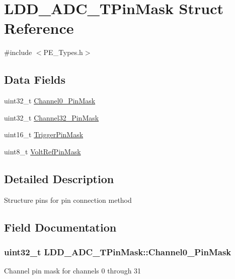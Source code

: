 \hypertarget{struct_l_d_d___a_d_c___t_pin_mask}{}\section{L\+D\+D\+\_\+\+A\+D\+C\+\_\+\+T\+Pin\+Mask Struct Reference}
\label{struct_l_d_d___a_d_c___t_pin_mask}


{\ttfamily \#include $<$P\+E\+\_\+\+Types.\+h$>$}

\subsection*{Data Fields}
\begin{DoxyCompactItemize}
\item 
uint32\+\_\+t \hyperlink{struct_l_d_d___a_d_c___t_pin_mask_a66d94f79f603c74c93540553a49bbf3f}{Channel0\+\_\+Pin\+Mask}
\item 
uint32\+\_\+t \hyperlink{struct_l_d_d___a_d_c___t_pin_mask_acd6bf6f512fb6e8cd170188dc663a4d8}{Channel32\+\_\+Pin\+Mask}
\item 
uint16\+\_\+t \hyperlink{struct_l_d_d___a_d_c___t_pin_mask_a004a4d3a4f4071684e6676f64322215f}{Trigger\+Pin\+Mask}
\item 
uint8\+\_\+t \hyperlink{struct_l_d_d___a_d_c___t_pin_mask_a556430a91304e7db634bda25091b892c}{Volt\+Ref\+Pin\+Mask}
\end{DoxyCompactItemize}


\subsection{Detailed Description}
Structure pins for pin connection method 

\subsection{Field Documentation}
\subsubsection[{\texorpdfstring{Channel0\+\_\+31\+Pin\+Mask}{Channel0_31PinMask}}]{\setlength{\rightskip}{0pt plus 5cm}uint32\+\_\+t L\+D\+D\+\_\+\+A\+D\+C\+\_\+\+T\+Pin\+Mask\+::\+Channel0\+\_\+Pin\+Mask}\hypertarget{struct_l_d_d___a_d_c___t_pin_mask_a66d94f79f603c74c93540553a49bbf3f}{}\label{struct_l_d_d___a_d_c___t_pin_mask_a66d94f79f603c74c93540553a49bbf3f}
Channel pin mask for channels 0 through 31 
